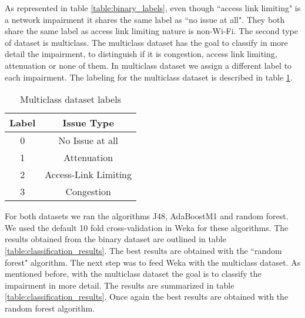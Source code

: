 As represented in table \ref{table:binary_labels}, even though ``access link limiting" is a network impairment it shares the same label as ``no issue at all". They both share the same label as access link limiting nature is non-Wi-Fi.
The second type of dataset is multiclass. The multiclass dataset has the goal to classify in more detail the impairment, to distinguish if it is congestion, access link limiting, attenuation or none of them. In multiclass dataset we assign a different label to each impairment. The labeling for the multiclass dataset is described in table \ref{table:multiclass_labels}.

\begin{table}[H]
	\begin{center}
		\begin{tabular}{||c c||} 
			\hline
			Label & Issue Type\\ [0.5ex] 
			\hline\hline
			0 & No Issue at all \\ 
			\hline
			1 & Attenuation\\
			\hline
			2 & Access-Link Limiting \\
			\hline
			3 & Congestion \\[1ex] 
			\hline
		\end{tabular}
		\caption{Multiclass dataset labels}
		\label{table:multiclass_labels}
	\end{center}
\end{table}

For both datasets we ran the algorithms J48, AdaBoostM1 and random forest. We used the default 10 fold cross-validation in Weka for these algorithms. The results obtained from the binary dataset are outlined in table \ref{table:classification_results}. The best results are obtained with the ``random forest" algorithm. The next step was to feed Weka with the multiclass dataset. As mentioned before, with the multiclass dataset the goal is to classify the impairment in more detail. The results are summarized in table \ref{table:classification_results}. Once again the best results are obtained with the random forest algorithm.



